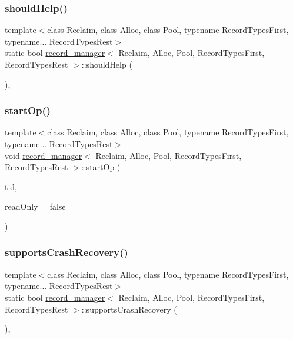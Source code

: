 \subsubsection{\texorpdfstring{should\+Help()}{shouldHelp()}}
{\footnotesize\ttfamily template$<$class Reclaim, class Alloc, class Pool, typename Record\+Types\+First, typename... Record\+Types\+Rest$>$ \\
static bool \hyperlink{classrecord__manager}{record\+\_\+manager}$<$ Reclaim, Alloc, Pool, Record\+Types\+First, Record\+Types\+Rest $>$\+::should\+Help (\begin{DoxyParamCaption}{ }\end{DoxyParamCaption})\hspace{0.3cm}{\ttfamily [inline]}, {\ttfamily [static]}}

\mbox{\label{classrecord__manager_a3bc2326875be2dee42eda9dc8620ee1c}} 
\subsubsection{\texorpdfstring{start\+Op()}{startOp()}}
{\footnotesize\ttfamily template$<$class Reclaim, class Alloc, class Pool, typename Record\+Types\+First, typename... Record\+Types\+Rest$>$ \\
void \hyperlink{classrecord__manager}{record\+\_\+manager}$<$ Reclaim, Alloc, Pool, Record\+Types\+First, Record\+Types\+Rest $>$\+::start\+Op (\begin{DoxyParamCaption}\item[{const int}]{tid,  }\item[{const bool}]{read\+Only = {\ttfamily false} }\end{DoxyParamCaption})\hspace{0.3cm}{\ttfamily [inline]}}

\mbox{\label{classrecord__manager_a1a93542bd25f1bf12db4c1c250b7e587}} 
\subsubsection{\texorpdfstring{supports\+Crash\+Recovery()}{supportsCrashRecovery()}}
{\footnotesize\ttfamily template$<$class Reclaim, class Alloc, class Pool, typename Record\+Types\+First, typename... Record\+Types\+Rest$>$ \\
static bool \hyperlink{classrecord__manager}{record\+\_\+manager}$<$ Reclaim, Alloc, Pool, Record\+Types\+First, Record\+Types\+Rest $>$\+::supports\+Crash\+Recovery (\begin{DoxyParamCaption}{ }\end{DoxyParamCaption})\hspace{0.3cm}{\ttfamily [inline]}, {\ttfamily [static]}}

